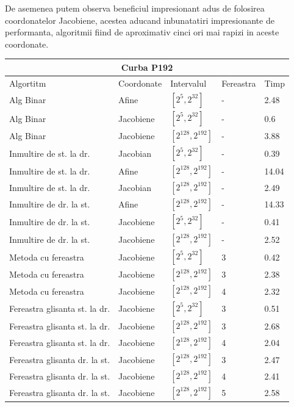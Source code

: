 De asemenea putem observa beneficiul impresionant adus de folosirea coordonatelor Jacobiene, acestea aducand inbunatatiri impresionante de performanta, algoritmii fiind de aproximativ cinci ori mai rapizi in aceste coordonate.


\begin{tabular}{ |p{5cm}||p{3cm}|p{3cm}|p{2cm}|p{1cm}|  }
 \hline
 \multicolumn{5}{|c|}{Curba P192} \\
 \hline
 Algortitm& Coordonate &Intervalul &Fereastra &Timp\\
 \hline
 Alg Binar & Afine  &$[2^{5},2^{32}]$& - & 2.48\\
 Alg Binar&Jacobiene  & $[2^{5},2^{32}]$ & - & 0.6\\
 Alg Binar&Jacobiene  & $[2^{128},2^{192}]$ & - & 3.88\\
 Inmultire de st. la dr. & Jacobian & $[2^{5},2^{32}]$& - & 0.39\\
 Inmultire de st. la dr. & Afine & $[2^{128},2^{192}]$& - & 14.04\\
 Inmultire de st. la dr. & Jacobian & $[2^{128},2^{192}]$& - & 2.49\\
 Inmultire de dr. la st. &Afine & $[2^{128},2^{192}]$ & - & 14.33\\
 Inmultire de dr. la st. &Jacobiene & $[2^{5},2^{32}]$ & - & 0.41\\
 Inmultire de dr. la st. &Jacobiene & $[2^{128},2^{192}]$ & - & 2.52\\
 Metoda cu fereastra& Jacobiene & $[2^{5},2^{32}]$ & 3 & 0.42\\
 Metoda cu fereastra& Jacobiene & $[2^{128},2^{192}]$ & 3 & 2.38\\
 Metoda cu fereastra& Jacobiene & $[2^{128},2^{192}]$ & 4 & 2.32\\
 Fereastra glisanta st. la dr.& Jacobiene  & $[2^{5},2^{32}]$& 3 & 0.51\\
 Fereastra glisanta st. la dr.& Jacobiene  & $[2^{128},2^{192}]$& 3 & 2.68\\
  Fereastra glisanta st. la dr.& Jacobiene  & $[2^{128},2^{192}]$& 4 & 2.04\\
 Fereastra glisanta dr. la st.& Jacobiene  & $[2^{128},2^{192}]$& 3 & 2.47\\
 Fereastra glisanta dr. la st.& Jacobiene  & $[2^{128},2^{192}]$& 4 & 2.41\\
 Fereastra glisanta dr. la st.& Jacobiene  & $[2^{128},2^{192}]$& 5 & 2.58\\
 \hline
\end{tabular}

